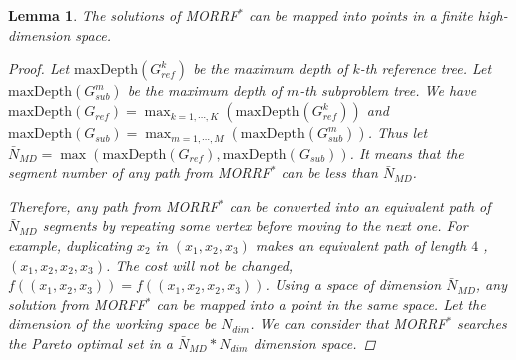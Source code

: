 \documentclass{article}
\newtheorem{lem}{Lemma}
\begin{document}
\begin{lem}
\label{lem:moo-d:rrt}
The solutions of MORRF$^{*}$ can be mapped into points in a finite high-dimension space.
\begin{proof}
Let $ \mbox{maxDepth}(G_{ref}^{k}) $ be the maximum depth of $ k $-th reference tree.
Let $ \mbox{maxDepth}(G_{sub}^{m}) $ be the maximum depth of $ m $-th subproblem tree.
We have $ \mbox{maxDepth}(G_{ref}) = \max_{k = 1 , \cdots , K} ( \mbox{maxDepth}(G_{ref}^{k}) ) $ and $ \mbox{maxDepth}(G_{sub}) = \max_{m = 1 , \cdots , M} ( \mbox{maxDepth}(G_{sub}^{m}) ) $.
Thus let 
 $ \bar{N}_{MD} = \max \left(  \mbox{maxDepth}(G_{ref}), \mbox{maxDepth}(G_{sub}) \right) $.
It means that the segment number of any path from MORRF$^{*}$ can be less than $ \bar{N}_{MD} $.

Therefore, any path from MORRF$^{*}$ can be converted into an equivalent path of $ \bar{N}_{MD} $ segments by repeating some vertex before moving to the next one.
For example, duplicating $ x_{2} $ in $ (x_{1} , x_{2}, x_{3} ) $ makes an equivalent path of length $ 4 $ , $ (x_{1} , x_{2},  x_{2}, x_{3} ) $.
The cost will not be changed, $ f( (x_{1} , x_{2}, x_{3}) ) = f( (x_{1} , x_{2},  x_{2}, x_{3} ) )$.
Using a space of dimension $ \bar{N}_{MD} $, any solution from MORFF$^{*}$ can be mapped into a point in the same space.
Let the dimension of the working space be $ N_{dim} $.
We can consider that MORRF$^{*}$ searches the Pareto optimal set in a $ \bar{N}_{MD} * N_{dim} $ dimension space.
\end{proof}
\end{lem}

\end{document}
